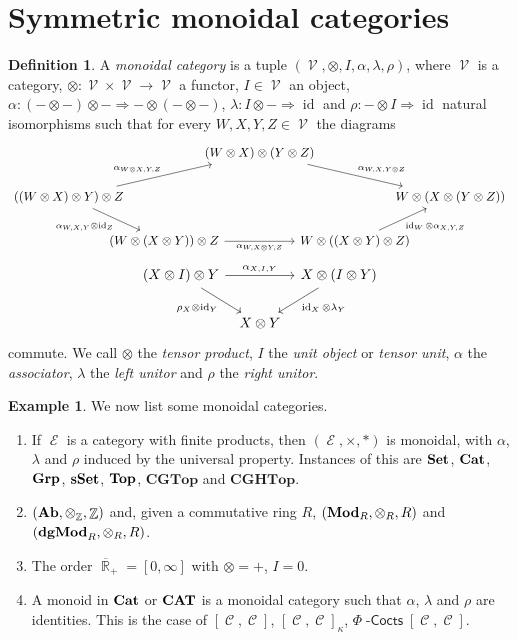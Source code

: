\documentclass[a4paper,11pt,oneside,openany]{scrbook}
\newcommand{\catname}[1]{{\normalfont\textbf{#1}}}
\newcommand{\Set}{\catname{Set}}
\newcommand{\Top}{\catname{Top}}
\newcommand{\Grp}{\catname{Grp}}
\newcommand{\Ab}{\catname{Ab}}
\newcommand{\Mod}{\catname{Mod}}
\newcommand{\dgMod}{\catname{dgMod}}
\newcommand{\sSet}{\catname{sSet}}
\newcommand{\Cat}{\catname{Cat}}
\newcommand{\CAT}{\catname{CAT}}
\DeclareMathOperator{\V}{\mathcal{V}}
\DeclareMathOperator{\C}{\mathcal{C}}
\DeclareMathOperator{\E}{\mathcal{E}}
\DeclareMathOperator{\Cocts}{-\mathsf{Cocts}}
\DeclareMathOperator{\Z}{\mathbb{Z}}
\DeclareMathOperator{\R}{\mathbb{R}}
\DeclareMathOperator{\id}{id}
\theoremstyle{definition}
\theoremstyle{definition}
\newtheorem{defn}[thm]{Definition} %
\newtheorem{exmp}[thm]{Example}
\begin{document}
\section{Symmetric monoidal categories}

\begin{defn}
    A \emph{monoidal category} is a tuple $(\V,\otimes,I,\alpha,\lambda,\rho)$, where $\V$ is a category, $\otimes\colon\V\times\V\rightarrow\V$ a functor, $I\in\V$ an object, $\alpha\colon(-\otimes-)\otimes-\Rightarrow-\otimes(-\otimes-)$, $\lambda\colon I\otimes-\Rightarrow\id$ and $\rho\colon-\otimes I\Rightarrow\id$ natural isomorphisms such that for every $W,X,Y,Z\in\V$ the diagrams
    \[
    \begin{tikzcd}[column sep = -2.0em]
    & & (W \otimes X) \otimes (Y \otimes Z) \arrow[drr, "\alpha_{W, X, Y \otimes Z}"] \\ 
    ((W \otimes X) \otimes Y) \otimes Z \arrow[urr, "\alpha_{W \otimes X, Y, Z}"] \arrow[dr,"\alpha_{W,X,Y} \otimes \id_Z", swap] 
    & & & & W \otimes (X \otimes (Y \otimes Z)) \\
    & (W \otimes (X \otimes Y)) \otimes Z \arrow[rr, "\alpha_{W, X \otimes Y, Z}", swap]
    & & W \otimes ((X \otimes Y) \otimes Z) \arrow[ur, "\id_{W}\otimes\alpha_{X,Y,Z}", swap]
    \end{tikzcd}
    \]
    \[
    \begin{tikzcd}[column sep=tiny]
    (X\otimes I)\otimes Y\ar[rr, "\alpha_{X,I,Y}"]\ar[dr, "\rho_X\otimes\id_Y", swap]
    && X\otimes (I\otimes Y)\ar[dl, "\id_X\otimes\lambda_Y"] \\
    & X\otimes Y
    \end{tikzcd}
    \]
    commute. We call $\otimes$ the \emph{tensor product}, $I$ the \emph{unit object} or \emph{tensor unit}, $\alpha$ the \emph{associator}, $\lambda$ the \emph{left unitor} and $\rho$ the \emph{right unitor}.
\end{defn}

\begin{exmp}
    We now list some monoidal categories.
    \begin{enumerate}
        \item If $\E$ is a category with finite products, then $(\E,\times,*)$ is monoidal, with $\alpha$, $\lambda$ and $\rho$ induced by the universal property. Instances of this are $\Set$, $\Cat$, $\Grp$, $\sSet$, $\Top$, $\mathbf{CGTop}$ and $\mathbf{CGHTop}$.
        \item $(\Ab,\otimes_{\Z},\Z)$ and, given a commutative ring $R$, $(\Mod_R,\otimes_R,R)$ and $(\dgMod_R,\otimes_R,R)$.
        \item The order $\overline{\R}_+=[0,\infty]$ with $\otimes=+$, $I=0$.
        \item A monoid in $\Cat$ or $\CAT$ is a monoidal category such that $\alpha$, $\lambda$ and $\rho$ are identities. This is the case of $[\C,\C]$, $[\C,\C]_\kappa$, $\Phi\Cocts[\C,\C]$.
    \end{enumerate}
\end{exmp}
\end{document}
